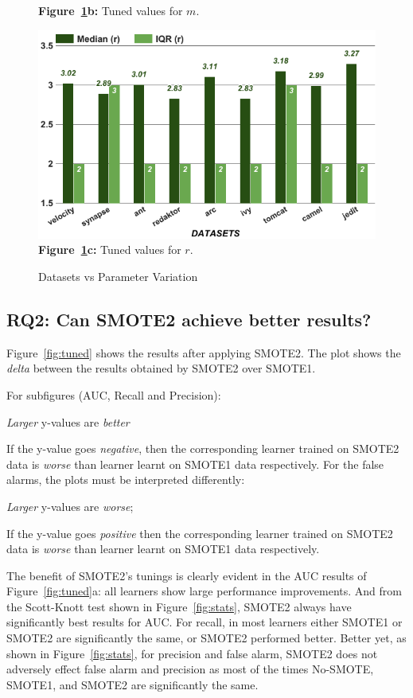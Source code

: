 \begin{figure}[!htbp]
\begin{minipage}{.33\textwidth}
        {\bf Figure~\ref{fig:para}b:} Tuned values for $m$.
    \end{minipage}
    \begin{minipage}{.33\textwidth}
    \centering
        \includegraphics[width=.95\linewidth]{./fig/r.png}
        {\bf Figure~\ref{fig:para}c:} Tuned values for $r$.
    \end{minipage}
    \caption{Datasets vs Parameter Variation}
    \label{fig:para}
\vspace{-0.4cm}
\end{figure}

\subsection{\textbf{RQ2: Can SMOTE2 achieve better results?}}

Figure~\ref{fig:tuned} shows the results
after applying SMOTE2. The
plot shows the {\em delta} between
the results obtained by SMOTE2 over SMOTE1.

For subfigures (AUC, Recall and Precision):
\bi
\item 
{\em Larger} y-values
are {\em better} 
\item
If the y-value goes {\em negative}, then the corresponding learner trained on SMOTE2 data is {\em worse} than learner learnt on SMOTE1 data respectively. 
\ei
For the false alarms, the
plots must be interpreted differently:
\bi
\item
{\em Larger} y-values are {\em worse};
\item
If the y-value goes {\em positive} then the corresponding learner trained on SMOTE2 data is {\em worse} than learner learnt on SMOTE1 data respectively.
\ei

The benefit of SMOTE2's tunings is clearly evident in the AUC results of  Figure~\ref{fig:tuned}a:
all learners show large performance improvements. And from the Scott-Knott test shown in Figure~\ref{fig:stats}, SMOTE2 always have significantly best results for AUC. For recall, in most learners either SMOTE1 or SMOTE2 are significantly the same, or SMOTE2 performed better. 
Better yet,  as
shown in
Figure~\ref{fig:stats}, for precision and false alarm, SMOTE2 does
not adversely effect false alarm and precision as most of the times No-SMOTE, SMOTE1, and SMOTE2 are significantly the same.


